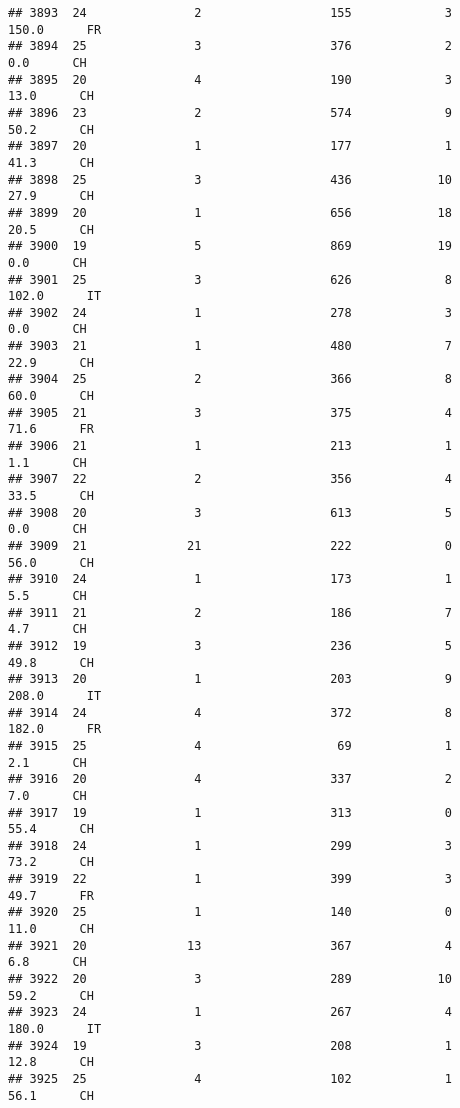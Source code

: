 \documentclass[
]{article}
\begin{document}
\begin{verbatim}
## 3893  24               2                  155             3    150.0      FR
## 3894  25               3                  376             2      0.0      CH
## 3895  20               4                  190             3     13.0      CH
## 3896  23               2                  574             9     50.2      CH
## 3897  20               1                  177             1     41.3      CH
## 3898  25               3                  436            10     27.9      CH
## 3899  20               1                  656            18     20.5      CH
## 3900  19               5                  869            19      0.0      CH
## 3901  25               3                  626             8    102.0      IT
## 3902  24               1                  278             3      0.0      CH
## 3903  21               1                  480             7     22.9      CH
## 3904  25               2                  366             8     60.0      CH
## 3905  21               3                  375             4     71.6      FR
## 3906  21               1                  213             1      1.1      CH
## 3907  22               2                  356             4     33.5      CH
## 3908  20               3                  613             5      0.0      CH
## 3909  21              21                  222             0     56.0      CH
## 3910  24               1                  173             1      5.5      CH
## 3911  21               2                  186             7      4.7      CH
## 3912  19               3                  236             5     49.8      CH
## 3913  20               1                  203             9    208.0      IT
## 3914  24               4                  372             8    182.0      FR
## 3915  25               4                   69             1      2.1      CH
## 3916  20               4                  337             2      7.0      CH
## 3917  19               1                  313             0     55.4      CH
## 3918  24               1                  299             3     73.2      CH
## 3919  22               1                  399             3     49.7      FR
## 3920  25               1                  140             0     11.0      CH
## 3921  20              13                  367             4      6.8      CH
## 3922  20               3                  289            10     59.2      CH
## 3923  24               1                  267             4    180.0      IT
## 3924  19               3                  208             1     12.8      CH
## 3925  25               4                  102             1     56.1      CH

\end{verbatim}
\end{document}

